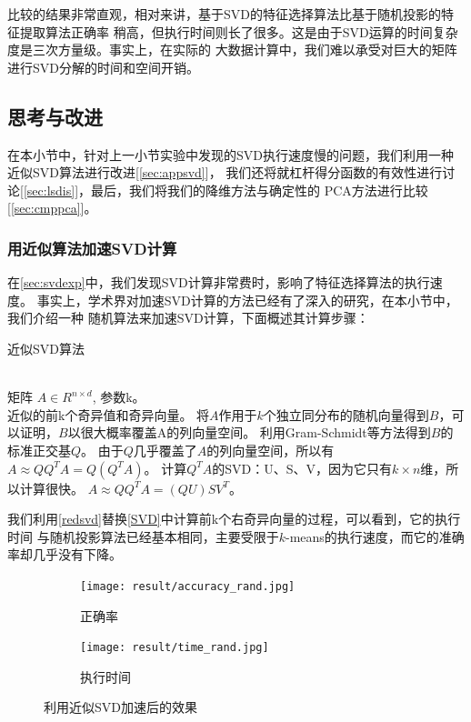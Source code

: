 \documentclass{ctexart}
\begin{document}
        比较的结果非常直观，相对来讲，基于SVD的特征选择算法比基于随机投影的特征提取算法正确率
        稍高，但执行时间则长了很多。这是由于SVD运算的时间复杂度是三次方量级。事实上，在实际的
        大数据计算中，我们难以承受对巨大的矩阵进行SVD分解的时间和空间开销\cite{blum2020foundations,halko2011finding,halko2011finding}。
    
    \subsection{思考与改进}
    在本小节中，针对上一小节实验中发现的SVD执行速度慢的问题，我们利用一种近似SVD算法进行改进[\autoref{sec:appsvd}]，
    我们还将就杠杆得分函数的有效性进行讨论[\autoref{sec:lsdis}]，最后，我们将我们的降维方法与确定性的
    PCA方法进行比较[\autoref{sec:cmppca}]。

    \subsubsection{用近似算法加速SVD计算}
    \label{sec:appsvd}
    在\autoref{sec:svdexp}中，我们发现SVD计算非常费时，影响了特征选择算法的执行速度。
    事实上，学术界对加速SVD计算的方法已经有了深入的研究\cite{halko2011finding}，在本小节中，我们介绍一种
    随机算法来加速SVD计算\cite{szlam2014implementation}，下面概述其计算步骤：
    \begin{algorithm}[H]
    \caption{近似SVD算法}
    \label{redsvd}
        \begin{algorithmic}[1] %
        \REQUIRE ~~\\ %
            矩阵 $ A \in R^{n \times d}$, 参数k。
        \ENSURE ~~\\ %
            近似的前k个奇异值和奇异向量。
        \STATE 将$A$作用于$k$个独立同分布的随机向量得到$B$，可以证明，$B$以很大概率覆盖A的列向量空间\cite{halko2011finding}。
        \STATE 利用Gram-Schmidt等方法得到$B$的标准正交基$Q$。
        \STATE 由于$Q$几乎覆盖了$A$的列向量空间，所以有$A \approx Q Q^T A = Q (Q^T A)$。
        \STATE 计算$Q^T A$的SVD：U、S、V，因为它只有$k \times n$维，所以计算很快。
        \STATE $A \approx Q Q^T A = (QU) S V^T$。
        \end{algorithmic}
    \end{algorithm}

    我们利用\autoref{redsvd}替换\autoref{SVD}中计算前k个右奇异向量的过程，可以看到，它的执行时间
    与随机投影算法已经基本相同，主要受限于$k$-means的执行速度，而它的准确率却几乎没有下降。
    \begin{figure}[H]
        \centering
        \begin{subfigure}{.5\textwidth}
            \centering
            \texttt{[image: result/accuracy\_rand.jpg]}
            \caption{正确率}
        \end{subfigure}%
        \begin{subfigure}{.5\textwidth}
            \centering
            \texttt{[image: result/time\_rand.jpg]}
            \caption{执行时间}
        \end{subfigure}
        \caption{利用近似SVD加速后的效果}
        \label{fig:3cmp}
    \end{figure}
\end{document}
